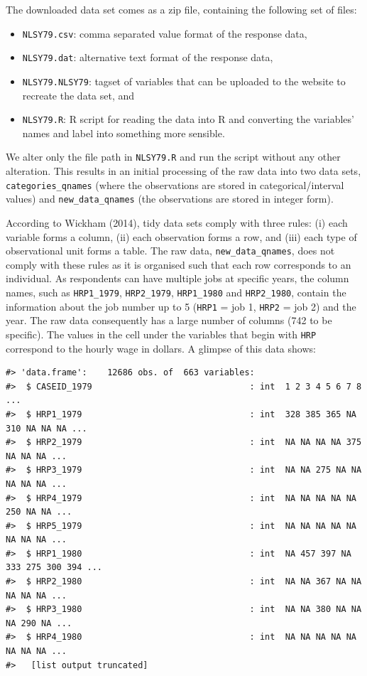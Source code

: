 \documentclass{article}
\providecommand{\tightlist}{%
  \setlength{\itemsep}{0pt}\setlength{\parskip}{0pt}}
\begin{document}
The downloaded data set comes as a zip file, containing the following set of files:

\begin{itemize}
\tightlist
\item
  \texttt{NLSY79.csv}: comma separated value format of the response data,
\item
  \texttt{NLSY79.dat}: alternative text format of the response data,
\item
  \texttt{NLSY79.NLSY79}: tagset of variables that can be uploaded to the website to recreate the data set, and
\item
  \texttt{NLSY79.R}: R script for reading the data into R and converting the variables' names and label into something more sensible.
\end{itemize}

We alter only the file path in \texttt{NLSY79.R} and run the script without any other alteration. This results in an initial processing of the raw data into two data sets, \texttt{categories\_qnames} (where the observations are stored in categorical/interval values) and \texttt{new\_data\_qnames} (the observations are stored in integer form).

According to Wickham (2014), tidy data sets comply with three rules: (i) each variable forms a column, (ii) each observation forms a row, and (iii) each type of observational unit forms a table. The raw data, \texttt{new\_data\_qnames}, does not comply with these rules as it is organised such that each row corresponds to an individual. As respondents can have multiple jobs at specific years, the column names, such as \texttt{HRP1\_1979}, \texttt{HRP2\_1979}, \texttt{HRP1\_1980} and \texttt{HRP2\_1980}, contain the information about the job number up to 5 (\texttt{HRP1} = job 1, \texttt{HRP2} = job 2) and the year. The raw data consequently has a large number of columns (742 to be specific). The values in the cell under the variables that begin with \texttt{HRP} correspond to the hourly wage in dollars. A glimpse of this data shows:

\begin{verbatim}
#> 'data.frame':    12686 obs. of  663 variables:
#>  $ CASEID_1979                               : int  1 2 3 4 5 6 7 8 ...
#>  $ HRP1_1979                                 : int  328 385 365 NA 310 NA NA NA ...
#>  $ HRP2_1979                                 : int  NA NA NA NA 375 NA NA NA ...
#>  $ HRP3_1979                                 : int  NA NA 275 NA NA NA NA NA ...
#>  $ HRP4_1979                                 : int  NA NA NA NA NA 250 NA NA ...
#>  $ HRP5_1979                                 : int  NA NA NA NA NA NA NA NA ...
#>  $ HRP1_1980                                 : int  NA 457 397 NA 333 275 300 394 ...
#>  $ HRP2_1980                                 : int  NA NA 367 NA NA NA NA NA ...
#>  $ HRP3_1980                                 : int  NA NA 380 NA NA NA 290 NA ...
#>  $ HRP4_1980                                 : int  NA NA NA NA NA NA NA NA ...
#>   [list output truncated]
\end{verbatim}
\end{document}
